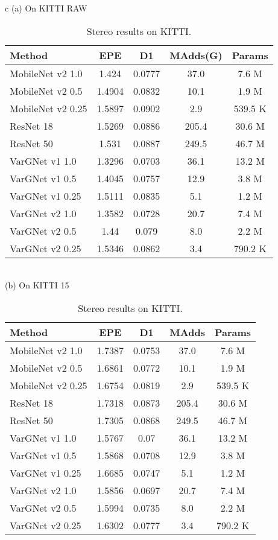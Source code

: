 \documentclass{article}
\begin{document}
\begin{table}
  \centering
  \caption{Stereo results on KITTI.}\label{tab:kitti_ste}
\begin{tabular}{c}
      (a) On KITTI RAW \\
      \begin{tabular}{lcccc}
        \toprule
        Method & EPE & D1 & MAdds(G) & Params  \\ \midrule
      MobileNet v2 1.0 & 1.424 & 0.0777 & 37.0 & 7.6 M \\
      MobileNet v2 0.5 & 1.4904 & 0.0832 & 10.1 & 1.9 M \\
      MobileNet v2 0.25 & 1.5897 & 0.0902 & 2.9 & 539.5 K \\
      ResNet 18 & 1.5269 & 0.0886 & 205.4    & 30.6 M \\
      ResNet 50 & 1.531 & 0.0887 & 249.5    & 46.7 M \\ \midrule
      VarGNet v1 1.0 & 1.3296 & 0.0703 & 36.1    & 13.2 M \\
      VarGNet v1 0.5 & 1.4045 & 0.0757 & 12.9    & 3.8 M \\
      VarGNet v1 0.25 & 1.5111 & 0.0835 & 5.1    & 1.2 M \\ \midrule
      VarGNet v2 1.0 & 1.3582 & 0.0728 & 20.7    & 7.4 M \\
      VarGNet v2 0.5 & 1.44 & 0.079 & 8.0    & 2.2 M \\
      VarGNet v2 0.25 & 1.5346 & 0.0862 & 3.4    & 790.2 K \\ \bottomrule
    \end{tabular} \\
    (b) On KITTI 15 \\
    \begin{tabular}{lcccc}
      \toprule
      Method & EPE & D1 & MAdds & Params  \\ \midrule
      MobileNet v2 1.0 &  1.7387 & 0.0753 & 37.0 & 7.6 M \\
      MobileNet v2 0.5 &  1.6861 & 0.0772 & 10.1 & 1.9 M \\
      MobileNet v2 0.25 & 1.6754 & 0.0819 & 2.9 & 539.5 K \\
      ResNet 18 & 1.7318 & 0.0873 & 205.4    & 30.6 M \\
      ResNet 50 & 1.7305 & 0.0868 & 249.5    & 46.7 M \\ \midrule
      VarGNet v1 1.0 & 1.5767 & 0.07 & 36.1    & 13.2 M \\
      VarGNet v1 0.5 & 1.5868 & 0.0708 & 12.9    & 3.8 M \\
      VarGNet v1 0.25 & 1.6685 & 0.0747 & 5.1    & 1.2 M \\ \midrule
      VarGNet v2 1.0 & 1.5856 & 0.0697 & 20.7    & 7.4 M \\
      VarGNet v2 0.5 & 1.5994 & 0.0735 & 8.0    & 2.2 M \\
      VarGNet v2 0.25 & 1.6302 & 0.0777 & 3.4    & 790.2 K \\ \bottomrule
    \end{tabular}
  \end{tabular}
\end{table}
\end{document}
